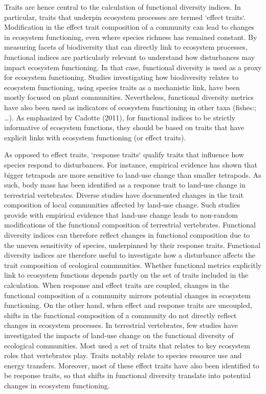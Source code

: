 Traits are hence central to the calculation of functional diversity indices. In particular, traits that underpin ecosystem processes are termed `effect traits`. Modification in the effect trait composition of a community can lead to changes in ecosystem functioning, even where species richness has remained constant. By measuring facets of biodiversity that can directly link to ecosystem processes, functional indices are particularly relevant to understand how disturbances may impact ecosystem functioning. In that case, functional diversity is used as a proxy for ecosystem functioning. Studies investigating how biodiversity relates to ecosystem functioning, using species traits as a mechanistic link, have been mostly focused on plant communities. Nevertheless, functional diversity metrics have also been used as indicators of ecosystem functioning in other taxa (fishes:; …). As emphasized by Cadotte (2011), for functional indices to be strictly informative of ecosystem functions, they should be based on traits that have explicit links with ecosystem functioning (or effect traits).

As opposed to effect traits, `response traits` qualify traits that influence how species respond to disturbances. For instance, empirical evidence has shown that bigger tetrapods are more sensitive to land-use change than smaller tetrapods. As such, body mass has been identified as a response trait to land-use change in terrestrial vertebrates. Diverse studies have documented changes in the trait composition of local communities affected by land-use change. Such studies provide with empirical evidence that land-use change leads to non-random modifications of the functional composition of terrestrial vertebrates. Functional diversity indices can therefore reflect changes in functional composition due to the uneven sensitivity of species, underpinned by their response traits. 
Functional diversity indices are therefore useful to investigate how a disturbance affects the trait composition of ecological communities. Whether functional metrics explicitly link to ecosystem functions depends partly on the set of traits included in the calculation. When response and effect traits are coupled, changes in the functional composition of a community mirrors potential changes in ecosystem functioning. On the other hand, when effect and response traits are uncoupled, shifts in the functional composition of a community do not directly reflect changes in ecosystem processes. In terrestrial vertebrates, few studies have investigated the impacts of land-use change on the functional diversity of ecological communities. Most used a set of traits that relates to key ecosystem roles that vertebrates play. Traits notably relate to species resource use and energy transfers. Moreover, most of these effect traits have also been identified to be response traits, so that shifts in functional diversity translate into potential changes in ecosystem functioning.

